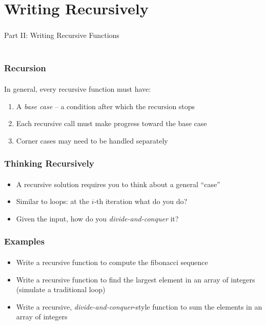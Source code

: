 \documentclass[]{beamer}
\begin{document}
\section{Writing Recursively}

\begin{frame}
    \frametitle{}
    \framesubtitle{}
    
    \begin{center}
    {\Huge Part II: Writing Recursive Functions}\\
    {\Large ~}
    \end{center}

\end{frame}

\begin{frame}[fragile]
  \frametitle{Recursion}
  \framesubtitle{}

In general, every recursive function must have:
\begin{enumerate}[<+->]
  \item A \emph{base case} -- a condition after which the recursion stops
  \item Each recursive call must make progress toward the base case
  \item Corner cases may need to be handled separately 
\end{enumerate}

\end{frame}

\begin{frame}[fragile]
  \frametitle{Thinking Recursively}
  \framesubtitle{}

\begin{itemize}[<+->]
  \item A recursive solution requires you to think about a general ``case''
  \item Similar to loops: at the $i$-th iteration what do you do?
  \item Given the input, how do you \emph{divide-and-conquer} it?
\end{itemize}

\end{frame}


\begin{frame}[fragile]
  \frametitle{Examples}
  \framesubtitle{}

\begin{itemize}[<+->]
  \item Write a recursive function to compute the fibonacci sequence
  \item Write a recursive function to find the largest element in an array
  of integers (simulate a traditional loop)
  \item Write a recursive, \emph{divide-and-conquer}-style function to
  sum the elements in an array of integers
\end{itemize}

\end{frame}
\end{document}
